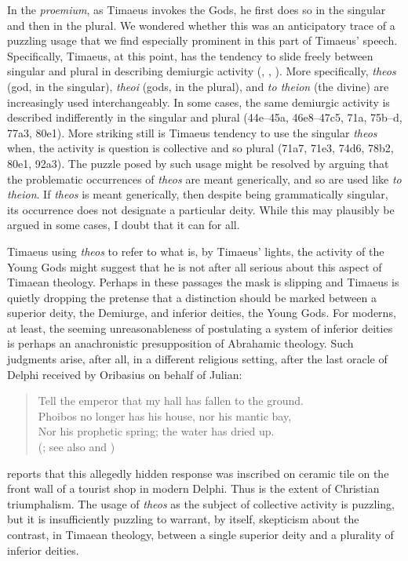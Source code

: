 In the \emph{proemium}, as Timaeus invokes the Gods, he first does so in the singular and then in the plural. We wondered whether this was an anticipatory trace of a puzzling usage that we find especially prominent in this part of Timaeus' speech. Specifically, Timaeus, at this point, has the tendency to slide freely between singular and plural in describing demiurgic activity (\citealt[280]{Cornford:1935fk}, \citealt[169]{Grube:1935ad}, \citealt[608]{Cherniss:1944aa}). More specifically, \emph{theos} (god, in the singular), \emph{theoi} (gods, in the plural), and \emph{to theion} (the divine) are increasingly used interchangeably. In some cases, the same demiurgic activity is described indifferently in the singular and plural (44e--45a, 46e8--47c5, 71a, 75b--d, 77a3, 80e1). More striking still is Timaeus tendency to use the singular \emph{theos} when, the activity is question is collective and so plural (71a7, 71e3, 74d6, 78b2, 80e1, 92a3). The puzzle posed by such usage might be resolved by arguing that the problematic occurrences of \emph{theos} are meant generically, and so are used like \emph{to theion}. If \emph{theos} is meant generically, then despite being grammatically singular, its occurrence does not designate a particular deity. While this may plausibly be argued in some cases, I doubt that it can for all. 

Timaeus using \emph{theos} to refer to what is, by Timaeus' lights, the activity of the Young Gods might suggest that he is not after all serious about this aspect of Timaean theology. Perhaps in these passages the mask is slipping and Timaeus is quietly dropping the pretense that a distinction should be marked between a superior deity, the Demiurge, and inferior deities, the Young Gods. For moderns, at least, the seeming unreasonableness of postulating a system of inferior deities is perhaps an anachronistic presupposition of Abrahamic theology. Such judgments arise, after all, in a different religious setting, after the last oracle of Delphi received by Oribasius on behalf of Julian:
\begin{verse}
	Tell the emperor that my hall has fallen to the ground.\\
	Phoibos no longer has his house, nor his mantic bay,\\
	Nor his prophetic spring; the water has dried up.\\
	(\citealt[353]{Fontenrose:1978aa}; see also \citealt[289--91]{Parke:1956aa} and \citealt[194--5]{Parke:1956ab})
\end{verse}
\citet[355 n2]{Gregory:1983aa} reports that this allegedly hidden response was inscribed on ceramic tile on the front wall of a tourist shop in modern Delphi. Thus is the extent of Christian triumphalism. The usage of \emph{theos} as the subject of collective activity is puzzling, but it is insufficiently puzzling to warrant, by itself, skepticism about the contrast, in Timaean theology, between a single superior deity and a plurality of inferior deities.

